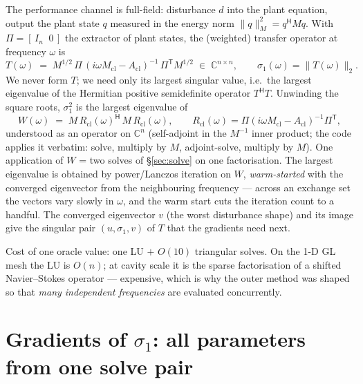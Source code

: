 \documentclass[11pt,a4paper]{article}
\newcommand{\C}{\mathbb{C}}
\newcommand{\Mcl}{M_{\mathrm{cl}}}
\newcommand{\Acl}{A_{\mathrm{cl}}}
\newcommand{\hp}{^{\mathsf H}}
\newcommand{\Rcl}{R_{\mathrm{cl}}}   %
\newcommand{\tp}{^{\mathsf T}}   %
\begin{document}
{The performance channel is full-field: disturbance $d$ into the plant equation, output the
plant state $q$ measured in the energy norm $\|q\|_M^2=q\hp Mq$.  With
$\Pi=[\,I_n\;\;0\,]$ the extractor of plant states, the (weighted) transfer operator at
frequency $\omega$ is
\[
T(\omega)\;=\;M^{1/2}\,\Pi\,(i\omega \Mcl-\Acl)^{-1}\,\Pi\tp M^{1/2}
\;\in\;\C^{n\times n},
\qquad
\sigma_1(\omega)=\|T(\omega)\|_2 .
\]
We never form $T$; we need only its largest singular value, i.e.\ the largest eigenvalue
of the Hermitian positive semidefinite operator $T\hp T$.  Unwinding the square roots,
$\sigma_1^2$ is the largest eigenvalue of
\begin{equation}
\boxed{\;
W(\omega)\;=\;M\,\Rcl(\omega)\hp\,M\,\Rcl(\omega),
\qquad
\Rcl(\omega)=\Pi(i\omega\Mcl-\Acl)^{-1}\Pi\tp ,
\;}
\label{eq:W}
\end{equation}
understood as an operator on $\C^n$ (self-adjoint in the $M^{-1}$ inner product; the code
applies it verbatim: solve, multiply by $M$, adjoint-solve, multiply by $M$).  One
application of $W$ = two solves of \S\ref{sec:solve} on one factorisation.  The largest
eigenvalue is obtained by power/Lanczos iteration on $W$, \emph{warm-started} with the
converged eigenvector from the neighbouring frequency --- across an exchange set the
vectors vary slowly in $\omega$, and the warm start cuts the iteration count to a
handful.  The converged eigenvector $v$ (the worst disturbance shape) and its image
give the singular pair $(u,\sigma_1,v)$ of $T$ that the gradients need next.

Cost of one oracle value: one LU $+$ $O(10)$ triangular solves.  On the 1-D GL mesh the LU
is $O(n)$; at cavity scale it is the sparse factorisation of a shifted Navier--Stokes
operator --- expensive, which is why the outer method was shaped so that \emph{many
independent frequencies} are evaluated concurrently.

\section{Gradients of $\sigma_1$: all parameters from one solve pair}
\label{sec:grads}

}
\end{document}

